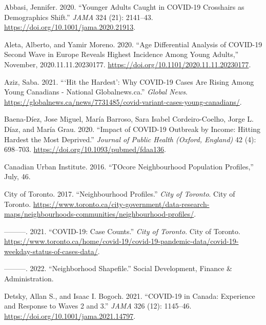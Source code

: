 \documentclass[]{article}
\newenvironment{CSLReferences}%
  {}%
  {\par}
\begin{document}
\hypertarget{refs}{}
\begin{CSLReferences}{1}{0}
\leavevmode{}%
Abbasi, Jennifer. 2020. {``Younger Adults Caught in COVID-19 Crosshairs
as Demographics Shift.''} \emph{JAMA} 324 (21): 2141--43.
\url{https://doi.org/10.1001/jama.2020.21913}.

\leavevmode{}%
Aleta, Alberto, and Yamir Moreno. 2020. {``Age Differential Analysis of
COVID-19 Second Wave in Europe Reveals Highest Incidence Among Young
Adults,''} November, 2020.11.11.20230177.
\url{https://doi.org/10.1101/2020.11.11.20230177}.

\leavevmode{}%
Aziz, Saba. 2021. {``{`Hit the Hardest'}: Why COVID-19 Cases Are Rising
Among Young Canadians - National \textbar{} Globalnews.ca.''}
\emph{Global News}.
\url{https://globalnews.ca/news/7731485/covid-variant-cases-young-canadians/}.

\leavevmode{}%
Baena-Díez, Jose Miguel, María Barroso, Sara Isabel Cordeiro-Coelho,
Jorge L. Díaz, and María Grau. 2020. {``Impact of COVID-19 Outbreak by
Income: Hitting Hardest the Most Deprived.''} \emph{Journal of Public
Health (Oxford, England)} 42 (4): 698--703.
\url{https://doi.org/10.1093/pubmed/fdaa136}.

\leavevmode{}%
Canadian Urban Institute. 2016. {``TOcore Neighbourhood Population
Profiles,''} July, 46.

\leavevmode{}%
City of Toronto. 2017. {``Neighbourhood Profiles.''} \emph{City of
Toronto}. City of Toronto.
\url{https://www.toronto.ca/city-government/data-research-maps/neighbourhoods-communities/neighbourhood-profiles/}.

\leavevmode{}%
---------. 2021. {``COVID-19: Case Counts.''} \emph{City of Toronto}.
City of Toronto.
\url{https://www.toronto.ca/home/covid-19/covid-19-pandemic-data/covid-19-weekday-status-of-cases-data/}.

\leavevmode{}%
---------. 2022. {``Neighborhood Shapefile.''} Social Development,
Finance \& Administration.

\leavevmode{}%
Detsky, Allan S., and Isaac I. Bogoch. 2021. {``COVID-19 in Canada:
Experience and Response to Waves 2 and 3.''} \emph{JAMA} 326 (12):
1145--46. \url{https://doi.org/10.1001/jama.2021.14797}.


\end{CSLReferences}
\end{document}
